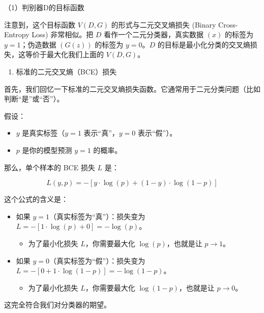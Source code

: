 （1）判别器D的目标函数

注意到，这个目标函数 \(V(D, G)\) 的形式与二元交叉熵损失 (Binary Cross-Entropy Loss) 非常相似。把 \(D\) 看作一个二元分类器，真实数据 \((x)\) 的标签为 \(y=1\)；伪造数据 \((G(z))\) 的标签为 \(y=0\)。\(D\) 的目标是最小化分类的交叉熵损失，这等价于最大化我们上面的 \(V(D, G)\)。

\begin{enumerate}
\def\labelenumi{\arabic{enumi}.}
\tightlist
\item
  标准的二元交叉熵（BCE）损失
\end{enumerate}

首先，我们回忆一下标准的二元交叉熵损失函数。它通常用于二元分类问题（比如判断``是''或``否''）。

假设：

\begin{itemize}
\tightlist
\item
  \(y\) 是真实标签（\(y=1\) 表示``真''，\(y=0\) 表示``假''）。
\item
  \(p\) 是你的模型预测 \(y=1\) 的概率。
\end{itemize}

那么，单个样本的 BCE 损失 \(L\) 是：

\[
L(y,p) = -[y\cdot\log(p) + (1-y)\cdot\log(1-p)]
\]

这个公式的含义是：

\begin{itemize}
\tightlist
\item
  如果 \(y=1\)（真实标签为``真''）：损失变为 \(L=-[1\cdot\log(p)+0]=-\log(p)\)。

  \begin{itemize}
  \tightlist
  \item
    为了最小化损失 \(L\)，你需要最大化 \(\log(p)\)，也就是让 \(p\to 1\)。
  \end{itemize}
\item
  如果 \(y=0\)（真实标签为``假''）：损失变为 \(L=-[0+1\cdot\log(1-p)]=-\log(1-p)\)。

  \begin{itemize}
  \tightlist
  \item
    为了最小化损失 \(L\)，你需要最大化 \(\log(1-p)\)，也就是让 \(p\to 0\)。
  \end{itemize}
\end{itemize}

这完全符合我们对分类器的期望。

